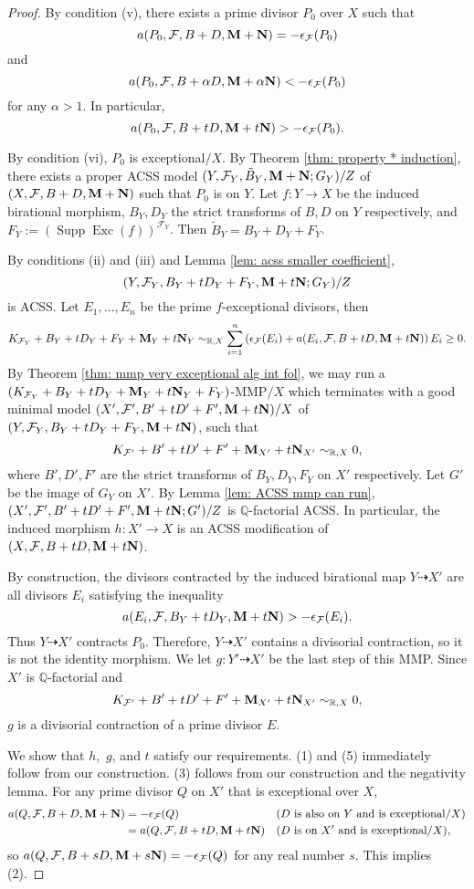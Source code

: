 \documentclass[11pt]{amsart}
\numberwithin{equation}{section}
\newcommand{\Mm}{{\bf{M}}}
\newcommand{\Nn}{{\bf{N}}}
\newcommand{\Qq}{\mathbb{Q}}
\newcommand{\Exc}{\operatorname{Exc}}
\newcommand{\Supp}{\operatorname{Supp}}
\newcommand{\Ff}{\mathcal{F}}
\theoremstyle{definition}
\theoremstyle{definition}
\theoremstyle{definition}
\begin{document}
\begin{proof}
By condition (v), there exists a prime divisor $P_0$ over $X$ such that 
$$a(P_0,\Ff,B+D,\Mm+\Nn)=-\epsilon_{\Ff}(P_0)$$
and
$$a(P_0,\Ff,B+\alpha D,\Mm+\alpha\Nn)<-\epsilon_{\Ff}(P_0)$$
for any $\alpha>1$. In particular, 
$$a(P_0,\Ff,B+tD,\Mm+t\Nn)>-\epsilon_{\Ff}(P_0).$$

By condition (vi), $P_0$ is exceptional$/X$. By Theorem \ref{thm: property * induction}, there exists a proper ACSS model $(Y,\Ff_Y,\tilde B_Y,\Mm+\Nn;G_Y)/Z$ of $(X,\Ff,B+D,\Mm+\Nn)$ such that $P_0$ is on $Y$. Let $f: Y\rightarrow X$ be the induced birational morphism, $B_Y,D_Y$ the strict transforms of $B,D$ on $Y$ respectively, and $F_{Y}:=(\Supp\Exc(f))^{\Ff_{Y}}$. Then $\tilde B_Y=B_Y+D_Y+F_Y$. 

By conditions (ii) and (iii) and Lemma \ref{lem: acss smaller coefficient},
$$(Y,\Ff_Y,B_Y+tD_Y+F_Y,\Mm+t\Nn;G_Y)/Z$$
is ACSS. Let $E_1,\dots,E_n$ be the prime $f$-exceptional divisors, then
$$K_{\Ff_Y}+B_Y+tD_Y+F_Y+\Mm_Y+t\Nn_Y\sim_{\mathbb R,X}\sum_{i=1}^n\left(\epsilon_{\Ff}(E_i)+a(E_i,\Ff,B+tD,\Mm+t\Nn)\right)E_i\geq 0.$$
By Theorem \ref{thm: mmp very exceptional alg int fol}, we may run a $(K_{\Ff_Y}+B_Y+tD_Y+\Mm_Y+t\Nn_Y+F_Y)$-MMP$/X$ which terminates with a good minimal model $(X',\Ff',B'+tD'+F',\Mm+t\Nn)/X$ of $(Y,\Ff_Y,B_Y+tD_Y+F_Y,\Mm+t\Nn)$, such that
$$K_{\Ff'}+B'+tD'+F'+\Mm_{X'}+t\Nn_{X'}\sim_{\mathbb R,X}0,$$ 
where $B',D',F'$ are the strict transforms of $B_Y,D_Y,F_Y$ on $X'$ respectively. Let $G'$ be the image of $G_Y$ on $X'$. By Lemma \ref{lem: ACSS mmp can run},  $(X',\Ff',B'+tD'+F',\Mm+t\Nn;G')/Z$ is $\Qq$-factorial ACSS. In particular, the induced morphism $h: X'\rightarrow X$ is an ACSS modification of $(X,\Ff,B+tD,\Mm+t\Nn)$.

By construction, the divisors contracted by the induced birational map $Y\dashrightarrow X'$ are all divisors $E_i$ satisfying the inequality
$$a(E_i,\Ff,B_Y+tD_Y,\Mm+t\Nn)>-\epsilon_{\Ff}(E_i).$$ 
Thus $Y\dashrightarrow X'$ contracts $P_0$. Therefore, $Y\dashrightarrow X'$ contains a divisorial contraction, so it is not the identity morphism. We let $g: Y'\dashrightarrow X'$ be the last step of this MMP. Since $X'$ is $\Qq$-factorial and $$K_{\Ff'}+B'+tD'+F'+\Mm_{X'}+t\Nn_{X'}\sim_{\mathbb R,X}0,$$ 
$g$ is a divisorial contraction of a prime divisor $E$. 

We show that $h,$ $g$, and $t$ satisfy our requirements. (1) and (5) immediately follow from our construction. (3) follows from our construction and the negativity lemma. %
For any prime divisor $Q$ on $X'$ that is exceptional over $X$, 
\begin{align*}
   a(Q,\Ff,B+D,\Mm+\Nn)&=-\epsilon_{\Ff}(Q) && \text{($D$ is also on $Y$ and is exceptional$/X$)}\\
                    &=a(Q,\Ff,B+tD,\Mm+t\Nn) &&  \text{($D$ is on $X'$ and is exceptional$/X$)},
\end{align*}
so $a(Q,\Ff,B+sD,\Mm+s\Nn)=-\epsilon_{\Ff}(Q)$ for any real number $s$. This implies (2). 


\end{proof}
\end{document}
